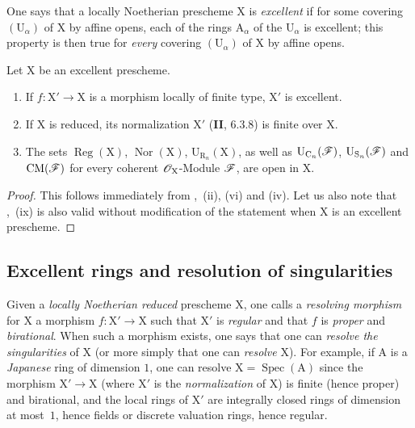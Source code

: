 \begin{env}[7.8.5]
\label{IV.7.8.5}
One says that a locally Noetherian prescheme $\mathrm{X}$ is \emph{excellent} if for some covering $(\mathrm{U}_\alpha)$ of $\mathrm{X}$ by affine opens, each of the rings $\mathrm{A}_\alpha$ of the $\mathrm{U}_\alpha$ is excellent; this property is then true for \emph{every} covering $(\mathrm{U}_\alpha)$ of $\mathrm{X}$ by affine opens.
\end{env}

\begin{proposition}[7.8.6]
\label{IV.7.8.6}
Let $\mathrm{X}$ be an excellent prescheme.
\begin{enumerate}[label=(\roman*)]
  \item If $f:\mathrm{X}'\to\mathrm{X}$ is a morphism locally of finite type, $\mathrm{X}'$ is excellent.


  \item If $\mathrm{X}$ is reduced, its normalization $\mathrm{X}'$ (\textbf{II}, $6.3.8$) is finite over $\mathrm{X}$.
  \item The sets $\operatorname{Reg}(\mathrm{X})$, $\operatorname{Nor}(\mathrm{X})$, $\mathrm{U}_{\mathrm{R}_n}(\mathrm{X})$, as well as $\mathrm{U}_{\mathrm{C}_n}(\mathscr{F})$, $\mathrm{U}_{\mathrm{S}_n}(\mathscr{F})$ and $\mathrm{CM}(\mathscr{F})$ for every coherent $\mathscr{O}_\mathrm{X}$-Module $\mathscr{F}$, are open in $\mathrm{X}$.
\end{enumerate}
\end{proposition}

\begin{proof}
This follows immediately from ,~(ii), (vi) and (iv). Let us also note that ,~(ix) is also valid without modification of the statement when $\mathrm{X}$ is an excellent prescheme.
\end{proof}


\subsection{Excellent rings and resolution of singularities}
\label{subsection:IV.7.9}

\begin{env}[7.9.1]
\label{IV.7.9.1}
Given a \emph{locally Noetherian reduced} prescheme $\mathrm{X}$, one calls a \emph{resolving morphism} for $\mathrm{X}$ a morphism $f:\mathrm{X}'\to\mathrm{X}$ such that $\mathrm{X}'$ is \emph{regular} and that $f$ is \emph{proper} and \emph{birational}. When such a morphism exists, one says that one can \emph{resolve the singularities} of $\mathrm{X}$ (or more simply that one can \emph{resolve} $\mathrm{X}$). For example, if $\mathrm{A}$ is a \emph{Japanese} ring of dimension $1$, one can resolve $\mathrm{X}=\operatorname{Spec}(\mathrm{A})$ since the morphism $\mathrm{X}'\to\mathrm{X}$ (where $\mathrm{X}'$ is the \emph{normalization} of $\mathrm{X}$) is finite (hence proper) and birational, and the local rings of $\mathrm{X}'$ are integrally closed rings of dimension at most~$1$, hence fields or discrete valuation rings, hence regular.
\end{env}

